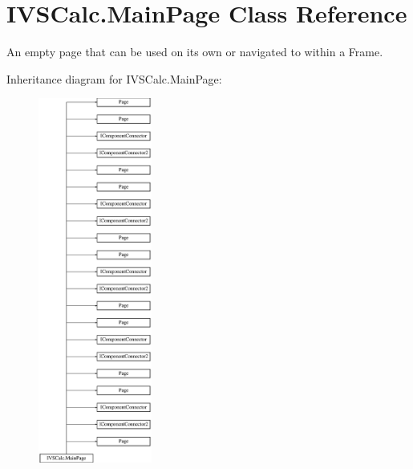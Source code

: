 \hypertarget{class_i_v_s_calc_1_1_main_page}{}\section{I\+V\+S\+Calc.\+Main\+Page Class Reference}
\label{class_i_v_s_calc_1_1_main_page}


An empty page that can be used on its own or navigated to within a Frame.  


Inheritance diagram for I\+V\+S\+Calc.\+Main\+Page\+:\begin{figure}[H]
\begin{center}
\leavevmode
\includegraphics[height=12.000000cm]{class_i_v_s_calc_1_1_main_page}
\end{center}
\end{figure}
